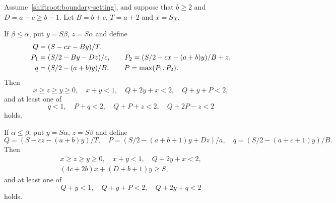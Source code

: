 \begin{proposition}
\label{normalizedout:initial}\label{initialin:constraints}
Assume~\eqref{shiftroot:boundary-setting}, and suppose that $b\ge2$ and $D=a-c\ge b-1$. Let $B=b+c$, $T=a+2$ and $x=S\chi$.

If $\beta\le\alpha$, put $y=S\beta$, $z=S\alpha$ and define
\begin{align}
 Q&=(S-cx-By)/T,\notag\\
 P_1&=(S/2-By-Dz)/c,\qquad
 P_2=(S/2-cx-(a+b)y)/B+z,\label{normalizedout:quantities}\\
 q&=(S/2-(a+b)y)/B,\qquad P=\max(P_1,P_2).\notag
\end{align}
Then
\begin{equation}\label{normalizedout:old}
 x\ge z\ge y\ge0,\quad x+y<1,\quad
 Q+2y+x<2,\quad Q+y+P<2,
\end{equation}
and at least one of
\begin{equation}\label{normalizedout:new}
 q<1,\quad P+q<2,\quad Q+P+z<2,\quad Q+2P-z<2
\end{equation}
holds.

If $\alpha\le\beta$, put $y=S\alpha$, $z=S\beta$ and define
\begin{equation}\label{initialin:prices}
 Q=(S-cz-(a+b)y)/T,\quad
 P=(S/2-(a+b+1)y+Dz)/a,\quad
 q=(S/2-(a+c+1)y)/B.
\end{equation}
Then
\begin{gather}
 x\ge z\ge y\ge0,\quad x+y<1,\quad Q+2y+x<2,
 \label{initialin:domain}\\
 (4c+2b)x+(D+b+1)y\ge S,\label{initialin:edge}
\end{gather}
and at least one of
\begin{equation}\label{initialin:disjunction}
 Q+y<1,\quad Q+y+P<2,\quad Q+2y+q<2
\end{equation}
holds.
\end{proposition}
